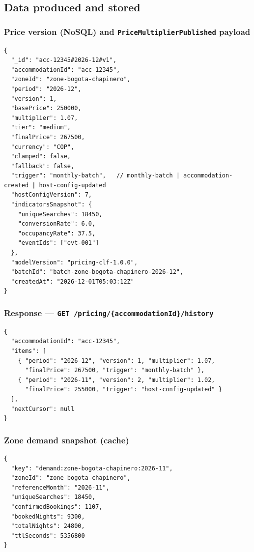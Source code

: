 \documentclass[11pt,a4paper]{article}
\begin{document}
\subsection{Data produced and stored}

\subsubsection{Price version (NoSQL) and \texttt{PriceMultiplierPublished} payload}
\begin{lstlisting}
{
  "_id": "acc-12345#2026-12#v1",
  "accommodationId": "acc-12345",
  "zoneId": "zone-bogota-chapinero",
  "period": "2026-12",
  "version": 1,
  "basePrice": 250000,
  "multiplier": 1.07,
  "tier": "medium",
  "finalPrice": 267500,
  "currency": "COP",
  "clamped": false,
  "fallback": false,
  "trigger": "monthly-batch",   // monthly-batch | accommodation-created | host-config-updated
  "hostConfigVersion": 7,
  "indicatorsSnapshot": {
    "uniqueSearches": 18450,
    "conversionRate": 6.0,
    "occupancyRate": 37.5,
    "eventIds": ["evt-001"]
  },
  "modelVersion": "pricing-clf-1.0.0",
  "batchId": "batch-zone-bogota-chapinero-2026-12",
  "createdAt": "2026-12-01T05:03:12Z"
}
\end{lstlisting}

\subsubsection{Response --- \texttt{GET /pricing/\{accommodationId\}/history}}
\begin{lstlisting}
{
  "accommodationId": "acc-12345",
  "items": [
    { "period": "2026-12", "version": 1, "multiplier": 1.07,
      "finalPrice": 267500, "trigger": "monthly-batch" },
    { "period": "2026-11", "version": 2, "multiplier": 1.02,
      "finalPrice": 255000, "trigger": "host-config-updated" }
  ],
  "nextCursor": null
}
\end{lstlisting}

\subsubsection{Zone demand snapshot (cache)}
\begin{lstlisting}
{
  "key": "demand:zone-bogota-chapinero:2026-11",
  "zoneId": "zone-bogota-chapinero",
  "referenceMonth": "2026-11",
  "uniqueSearches": 18450,
  "confirmedBookings": 1107,
  "bookedNights": 9300,
  "totalNights": 24800,
  "ttlSeconds": 5356800
}
\end{lstlisting}
\end{document}
